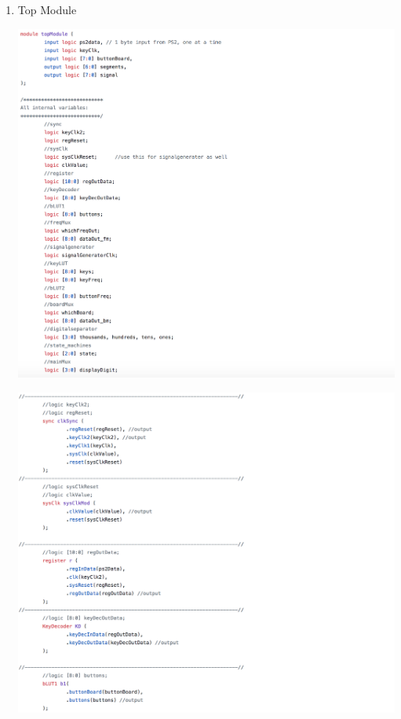 \documentclass[a4paper]{article}
\begin{document}
\begin{enumerate}

\item Top Module

    \includegraphics[width=6 in]{./Images/Archive/1-TopMod1.png}

    \includegraphics[width=6 in]{./Images/Archive/1-TopMod2.png}


\end{enumerate}
\end{document}
